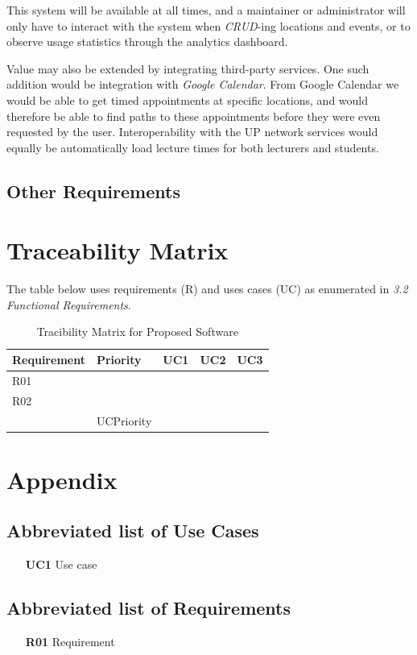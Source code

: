 \documentclass[12pt,a4paper]{article}
\begin{document}
			This system will be available at all times, and a maintainer or
			administrator will only have to interact with the system when
			\textit{CRUD}-ing locations and events, or to observe usage statistics
			through the analytics dashboard.

			\medskip

			Value may also be extended by integrating third-party services. One such
			addition would be integration with \textit{Google Calendar}. From Google
			Calendar we would be able to get timed appointments at specific locations,
			and would therefore be able to find paths to these appointments before
			they were even requested by the user. Interoperability with the UP network
			services would equally be automatically load lecture times for both
			lecturers and students.

		\subsection{Other Requirements}

	\section{Traceability Matrix}

	The table below uses requirements (R) and uses cases (UC) as enumerated in
	\textit{3.2 Functional Requirements}.

	\begin{table}[!h]
		\centering
		\caption{Tracibility Matrix for Proposed Software}
		\label{my-label}
		\begin{tabular}{|ll|l|l|l|}
			\hline
			\multicolumn{1}{|l|}{Requirement} & Priority & UC1 & UC2 & UC3 \\ \hline
			\multicolumn{1}{|l|}{R01}            &          &     &     &     \\ \hline
			\multicolumn{1}{|l|}{R02}            &          &     &     &     \\ \hline
														&    UCPriority   &     &     &     \\ \hline
		\end{tabular}
	\end{table}

	\section{Appendix}

		\subsection{Abbreviated list of Use Cases}

			\begin{itemize}
				\item [\textbf{UC1}] Use case
			\end{itemize}

		\subsection{Abbreviated list of Requirements}

			\begin{itemize}
				\item [\textbf{R01}] Requirement
			\end{itemize}
\end{document}
